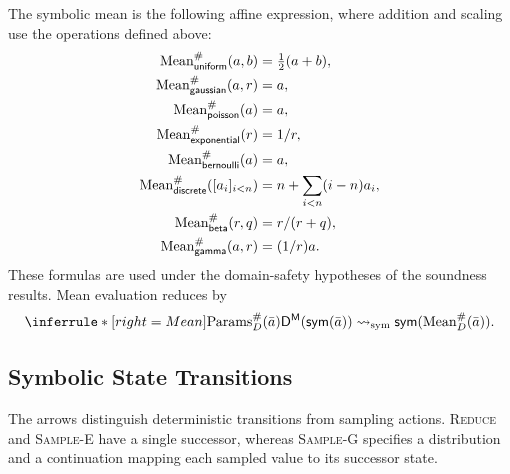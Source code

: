 The symbolic mean is the following affine expression,
where addition and scaling use the operations defined above:
\[
\begin{aligned}
\operatorname{Mean}^{\#}_{\mathsf{uniform}}(a,b)
  &=\tfrac12(a+b),\\
\operatorname{Mean}^{\#}_{\mathsf{gaussian}}(a,r)
  &=a,\\
\operatorname{Mean}^{\#}_{\mathsf{poisson}}(a)
  &=a,\\
\operatorname{Mean}^{\#}_{\mathsf{exponential}}(r)
  &=1/r,\\
\operatorname{Mean}^{\#}_{\mathsf{bernoulli}}(a)
  &=a,\\
\operatorname{Mean}^{\#}_{\mathsf{discrete}}([a_i]_{i<n})
  &=n+\sum_{i<n}(i-n)a_i,\\
\operatorname{Mean}^{\#}_{\mathsf{beta}}(r,q)
  &=r/(r+q),\\
\operatorname{Mean}^{\#}_{\mathsf{gamma}}(a,r)
  &=(1/r)a.
\end{aligned}
\]
These formulas are used under the domain-safety hypotheses
of the soundness results. Mean evaluation reduces by
\[
\inferrule*[right=Mean]
  {\operatorname{Params}^{\#}_D(\bar a)}
  {\avg D{\sym{\bar a}}
    \rightsquigarrow_{\mathrm{sym}}
    \sym{\operatorname{Mean}^{\#}_D(\bar a)}}.
\]

\subsection{Symbolic State Transitions}

The arrows distinguish deterministic transitions from sampling actions.
\textsc{Reduce} and \textsc{Sample-E} have a single successor, whereas
\textsc{Sample-G} specifies a distribution and a continuation mapping
each sampled value to its successor state.


